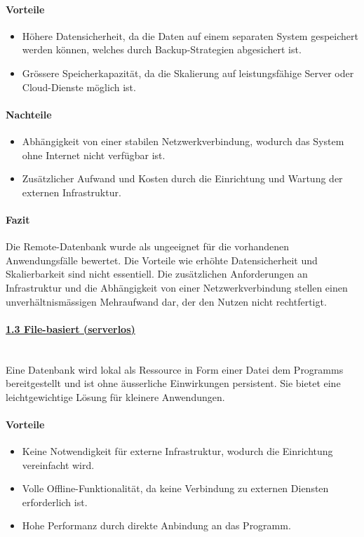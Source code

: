 \documentclass[a4paper,12pt]{report}
\begin{document}
    \paragraph*{Vorteile}
    \begin{itemize}
        \item Höhere Datensicherheit, da die Daten auf einem separaten System gespeichert werden können, welches durch Backup-Strategien abgesichert ist.
        \item Grössere Speicherkapazität, da die Skalierung auf leistungsfähige Server oder Cloud-Dienste möglich ist.
    \end{itemize}

    \paragraph*{Nachteile}
    \begin{itemize}
        \item Abhängigkeit von einer stabilen Netzwerkverbindung, wodurch das System ohne Internet nicht verfügbar ist.
        \item Zusätzlicher Aufwand und Kosten durch die Einrichtung und Wartung der externen Infrastruktur.
    \end{itemize}

    \paragraph*{Fazit}
    Die Remote-Datenbank wurde als ungeeignet für die vorhandenen Anwendungsfälle bewertet.
    Die Vorteile wie erhöhte Datensicherheit und Skalierbarkeit sind nicht essentiell.
    Die zusätzlichen Anforderungen an Infrastruktur und die Abhängigkeit von einer Netzwerkverbindung stellen einen unverhältnismässigen Mehraufwand dar, der den Nutzen nicht rechtfertigt.

    \paragraph*{\underline{1.3 File-basiert (serverlos)}}\mbox{}\\
    Eine Datenbank wird lokal als Ressource in Form einer Datei dem Programms bereitgestellt und ist ohne äusserliche Einwirkungen persistent.
    Sie bietet eine leichtgewichtige Lösung für kleinere Anwendungen.

    \paragraph*{Vorteile}
    \begin{itemize}
        \item Keine Notwendigkeit für externe Infrastruktur, wodurch die Einrichtung vereinfacht wird.
        \item Volle Offline-Funktionalität, da keine Verbindung zu externen Diensten erforderlich ist.
        \item Hohe Performanz durch direkte Anbindung an das Programm.
    \end{itemize}
\end{document}
